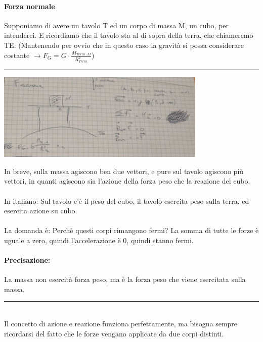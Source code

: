 \documentclass[12pt, a4paper, openany, oneside]{book}
\begin{document}
\paragraph{Forza normale}
Supponiamo di avere un tavolo T ed un corpo di massa M, un cubo, per intenderci.
E ricordiamo che il tavolo sta al di sopra della terra, che chiameremo TE. 
(Mantenendo per ovvio che in questo caso la gravità si possa considerare 
costante $\to F_{G} = G \cdot \frac{M_{Terra \cdot M}}{R_{Terra}^{2}}$)
\\
{\color{black} \rule{\linewidth}{0.3mm} }
\begin{center}
\includegraphics[width=0.75\textwidth]{forzanormale}
\end{center}
In breve, sulla massa agiscono ben due vettori, e pure sul tavolo agiscono più
vettori, in quanti agiscono sia l'azione della forza peso che la reazione del 
cubo. \\ \\
In italiano: Sul tavolo c'è il peso del cubo, il tavolo esercita peso sulla terra,
ed esercita azione su cubo. \\ \\
La domanda è: Perchè questi corpi rimangono fermi? La somma di tutte le forze
è uguale a zero, quindi l'accelerazione è 0, quindi stanno fermi.
\paragraph{Precisazione:} La massa non esercità forza peso, ma è la forza peso
che viene esercitata sulla massa.
\\
{\color{black} \rule{\linewidth}{0.3mm} }
\\
Il concetto di azione e reazione funziona perfettamente, ma bisogna sempre
ricordarsi del fatto che le forze vengano applicate da due corpi distinti.
\end{document}
